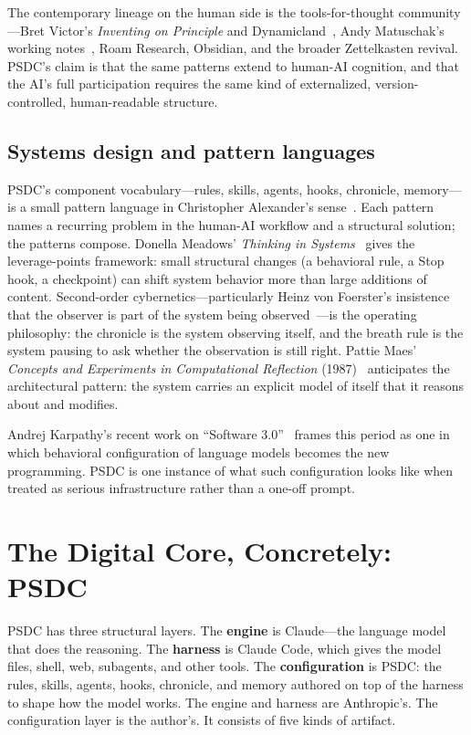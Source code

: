 \documentclass[12pt]{article}
\begin{document}
The contemporary lineage on the human side is the tools-for-thought community---Bret Victor's \emph{Inventing on Principle} and Dynamicland~\cite{victor}, Andy Matuschak's working notes~\cite{matuschak}, Roam Research, Obsidian, and the broader Zettelkasten revival. PSDC's claim is that the same patterns extend to human-AI cognition, and that the AI's full participation requires the same kind of externalized, version-controlled, human-readable structure.

\subsection{Systems design and pattern languages}

PSDC's component vocabulary---rules, skills, agents, hooks, chronicle, memory---is a small pattern language in Christopher Alexander's sense~\cite{alexander}. Each pattern names a recurring problem in the human-AI workflow and a structural solution; the patterns compose. Donella Meadows' \emph{Thinking in Systems}~\cite{meadows} gives the leverage-points framework: small structural changes (a behavioral rule, a Stop hook, a checkpoint) can shift system behavior more than large additions of content. Second-order cybernetics---particularly Heinz von Foerster's insistence that the observer is part of the system being observed~\cite{vonfoerster}---is the operating philosophy: the chronicle is the system observing itself, and the breath rule is the system pausing to ask whether the observation is still right. Pattie Maes' \emph{Concepts and Experiments in Computational Reflection} (1987)~\cite{maes} anticipates the architectural pattern: the system carries an explicit model of itself that it reasons about and modifies.

Andrej Karpathy's recent work on ``Software 3.0''~\cite{karpathy} frames this period as one in which behavioral configuration of language models becomes the new programming. PSDC is one instance of what such configuration looks like when treated as serious infrastructure rather than a one-off prompt.

\section{The Digital Core, Concretely: PSDC}
\label{sec:psdc}

PSDC has three structural layers. The \textbf{engine} is Claude---the language model that does the reasoning. The \textbf{harness} is Claude Code, which gives the model files, shell, web, subagents, and other tools. The \textbf{configuration} is PSDC: the rules, skills, agents, hooks, chronicle, and memory authored on top of the harness to shape how the model works. The engine and harness are Anthropic's. The configuration layer is the author's. It consists of five kinds of artifact.
\end{document}
